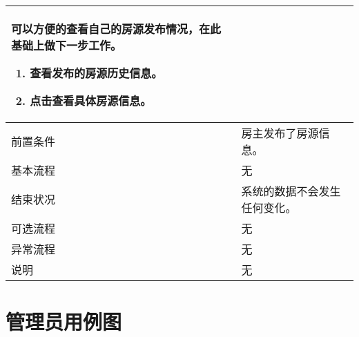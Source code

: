 \begin{table}[htbp]
\begin{tabular}{|l|l|l|l|}
{\begin{minipage}[t]{0.8\textwidth}
                可以方便的查看自己的房源发布情况，在此基础上做下一步工作。
                \begin{enumerate}
                    \item 查看发布的房源历史信息。
                    \item 点击查看具体房源信息。
                \end{enumerate}
                \vspace{.5em}
            \end{minipage}}                                                                                                                                                                                  \\
        \hline
        前置条件                          & \multicolumn{3}{l|}{房主发布了房源信息。}                                                                                                                                \\
        \hline
        基本流程                          & \multicolumn{3}{l|}{无}                                                                                                                                                  \\
        \hline
        结束状况                          & \multicolumn{3}{l|}{系统的数据不会发生任何变化。   }                                                                                                                     \\
        \hline
        可选流程                          & \multicolumn{3}{l|}{无}                                                                                                                                                  \\
        \hline
        异常流程                          & \multicolumn{3}{l|}{无}                                                                                                                                                  \\
        \hline
        说明                              & \multicolumn{3}{l|}{ 无}                                                                                                                                                 \\
        \hline
    \end{tabular}
\end{table}

\section{管理员用例图}

